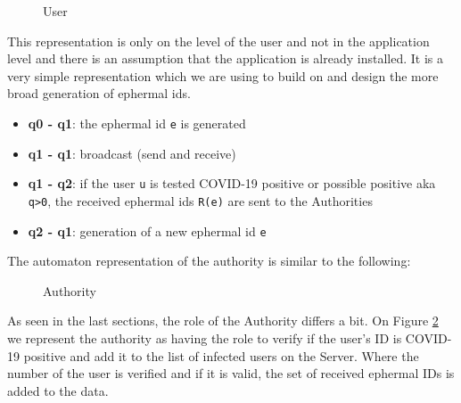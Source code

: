 \documentclass[a4paper, twocolumn]{article}
\begin{document}
\begin{figure}[H]
    \centering
    \caption{User}
    \label{fig:usr} 
\end{figure}
\noindent This representation is only on the level of the user and not in the application level and there is an assumption that the application is already installed. It is a very simple representation which we are using to build on and design the more broad generation of ephermal ids.
\begin{itemize}
    \item \textbf{q0 - q1}: the ephermal id \texttt{e} is generated
    \item \textbf{q1 - q1}: broadcast (send and receive)
    \item \textbf{q1 - q2}: if the user \texttt{u} is tested COVID-19 positive or possible positive aka \texttt{q>0}, the received ephermal ids \texttt{R(e)} are sent to the Authorities 
    \item \textbf{q2 - q1}: generation of a new ephermal id \texttt{e}
\end{itemize}
The automaton representation of the authority is similar to the following:\\
\begin{figure}[H]
    \centering
    \caption{Authority}
    \label{fig:authority} 
\end{figure}
\noindent As seen in the last sections, the role of the Authority differs a bit. On Figure \ref{fig:authority} we represent the authority as having the role to verify if the user's ID is COVID-19 positive and add it to the list of infected users on the Server. Where the number of the user is verified and if it is valid, the set of received ephermal IDs is added to the data.\\
\end{document}
